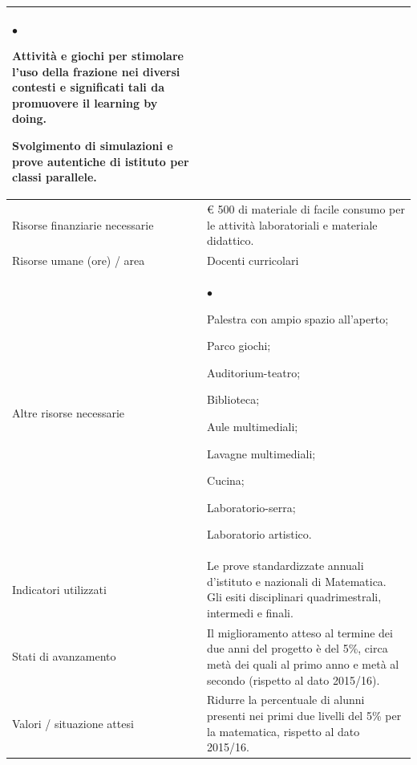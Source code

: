 \documentclass[12pt,a4paper,oneside]{memoir}
\newenvironment{elenco}{\begin{list}{$\bullet$}{%
              \setlength{\leftmargin}{4mm}%
              \setlength{\rightmargin}{1mm}%
               \setlength{\itemindent}{0mm}%
               \setlength{\labelwidth}{2mm}%
               \setlength{\labelsep}{2mm}%
              \setlength{\itemsep}{-\parsep}%
              \setlength{\partopsep}{0pt}%
              \setlength{\topsep}{0pt}%
             \setlength{\parskip}{0pt}%
              }}{\end{list}}
\begin{document}
\begin{footnotesize}
\begin{longtable}{|>{\raggedright}p{2.5cm}|>{\raggedright\arraybackslash}P{10cm}|}
\begin{elenco}
\item Attività e giochi per stimolare l'uso della frazione nei diversi contesti e significati tali da promuovere il learning by doing.
\item Svolgimento di simulazioni e prove autentiche di istituto per classi parallele.
\end{elenco}\\[-4mm] \hline
Risorse finanziarie necessarie&€ 500 di materiale di facile consumo per le attività laboratoriali e materiale didattico. \\ \hline
Risorse umane (ore) / area&Docenti curricolari \\ \hline
Altre risorse necessarie&
\begin{elenco}
\item Palestra con ampio spazio all’aperto; 
\item Parco giochi; 
\item Auditorium-teatro;
\item Biblioteca; 
\item Aule multimediali;
\item Lavagne multimediali;
\item Cucina;
\item Laboratorio-serra;
\item Laboratorio artistico.
\end{elenco}\\[-4mm] \hline 
Indicatori utilizzati &Le prove standardizzate annuali d'istituto e nazionali di Matematica. Gli esiti disciplinari quadrimestrali, intermedi e finali. \\ \hline
Stati di avanzamento&Il miglioramento atteso al termine dei due anni del progetto è del 5\%, circa metà dei quali al primo anno e metà al secondo (rispetto al dato 2015/16).\\ \hline
Valori / situazione attesi&Ridurre la percentuale di alunni presenti nei primi due livelli del 5\% per la matematica, rispetto al dato 2015/16.\\ \hline
\end{longtable}
\end{footnotesize}

\vspace{24pt}
\end{document}
